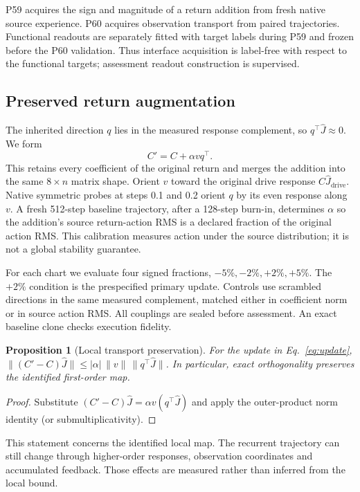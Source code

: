 \documentclass[11pt]{article}
\newtheorem{proposition}{Proposition}
\begin{document}
P59 acquires the sign and magnitude of a return addition from fresh native source experience. P60 acquires observation transport from paired trajectories. Functional readouts are separately fitted with target labels during P59 and frozen before the P60 validation. Thus interface acquisition is label-free with respect to the functional targets; assessment readout construction is supervised.

\subsection{Preserved return augmentation}
The inherited direction $q$ lies in the measured response complement, so $q^\top\widehat J\approx0$. We form
\begin{equation}
 C'=C+\alpha vq^\top .\label{eq:update}
\end{equation}
This retains every coefficient of the original return and merges the addition into the same $8\times n$ matrix shape. Orient $v$ toward the original drive response $C\widehat J_{\mathrm{drive}}$. Native symmetric probes at steps 0.1 and 0.2 orient $q$ by its even response along $v$. A fresh 512-step baseline trajectory, after a 128-step burn-in, determines $\alpha$ so the addition's source return-action RMS is a declared fraction of the original action RMS. This calibration measures action under the source distribution; it is not a global stability guarantee.

For each chart we evaluate four signed fractions, $-5\%,-2\%,+2\%,+5\%$. The $+2\%$ condition is the prespecified primary update. Controls use scrambled directions in the same measured complement, matched either in coefficient norm or in source action RMS. All couplings are sealed before assessment. An exact baseline clone checks execution fidelity.

\begin{samepage}
\begin{proposition}[Local transport preservation]
For the update in Eq.~\eqref{eq:update},
$\|(C'-C)\widehat J\|\leq |\alpha|\,\|v\|\,\|q^\top\widehat J\|$.
In particular, exact orthogonality preserves the identified first-order map.
\end{proposition}
\begin{proof}
Substitute $(C'-C)\widehat J=\alpha v(q^\top\widehat J)$ and apply the outer-product norm identity (or submultiplicativity).
\end{proof}
\end{samepage}
This statement concerns the identified local map. The recurrent trajectory can still change through higher-order responses, observation coordinates and accumulated feedback. Those effects are measured rather than inferred from the local bound.
\end{document}
